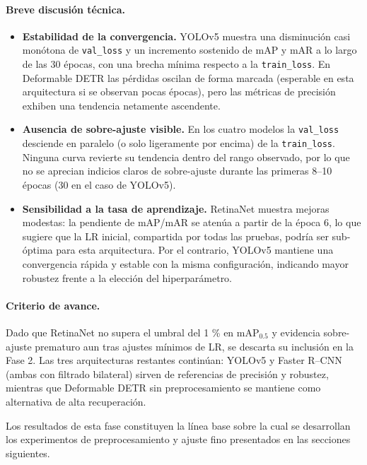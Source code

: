\paragraph{Breve discusión técnica.}
\begin{itemize}
  \item \textbf{Estabilidad de la convergencia.}
        YOLOv5 muestra una disminución casi monótona de \texttt{val\_loss} y un incremento sostenido de mAP y mAR a lo largo de las 30 épocas, con una brecha mínima respecto a la \texttt{train\_loss}.
        En Deformable DETR las pérdidas oscilan de forma marcada (esperable en esta arquitectura si se observan pocas épocas), pero las métricas de precisión exhiben una tendencia netamente ascendente.

  \item \textbf{Ausencia de sobre-ajuste visible.}
        En los cuatro modelos la \texttt{val\_loss} desciende en paralelo (o solo ligeramente por encima) de la \texttt{train\_loss}.
        Ninguna curva revierte su tendencia dentro del rango observado, por lo que no se aprecian indicios claros de sobre-ajuste durante las primeras 8–10 épocas (30 en el caso de YOLOv5).

  \item \textbf{Sensibilidad a la tasa de aprendizaje.}
        RetinaNet muestra mejoras modestas: la pendiente de mAP/mAR se atenúa a partir de la época 6, lo que sugiere que la LR inicial, compartida por todas las pruebas, podría ser sub-óptima para esta arquitectura.
        Por el contrario, YOLOv5 mantiene una convergencia rápida y estable con la misma configuración, indicando mayor robustez frente a la elección del hiperparámetro.
\end{itemize}

\paragraph{Criterio de avance.}
Dado que RetinaNet no supera el umbral del 1 \% en mAP$_{0.5}$ y evidencia sobre-ajuste prematuro aun tras ajustes mínimos de LR, se descarta su inclusión en la Fase 2.
Las tres arquitecturas restantes continúan: YOLOv5 y Faster R–CNN (ambas con filtrado bilateral) sirven de referencias de precisión y robustez, mientras que Deformable DETR sin preprocesamiento se mantiene como alternativa de alta recuperación.

\vspace{0.5em}
Los resultados de esta fase constituyen la línea base sobre la cual se desarrollan los experimentos de preprocesamiento y ajuste fino presentados en las secciones siguientes.

